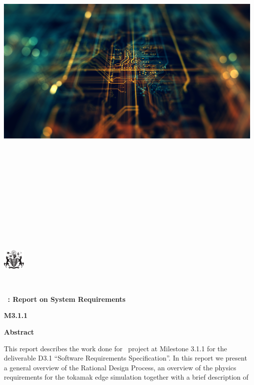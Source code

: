 \documentclass{article}
\begin{document}
\includegraphics[width=952pt, height=520pt, keepaspectratio=true]{../corpics/cctboard.jpg}

\includegraphics[width=31pt, height=29pt, keepaspectratio=true]{../corpics/UKAEA-arms.png}

{\huge{}{ \textbf{\exc \   }}}

{\huge{}{ \textbf{\nep \  : Report on System Requirements}}}

{\huge{}{ \textbf{M3.1.1}}}

\baselineskip=12pt
{ \textbf{Abstract}}

This report describes the work done for \nep \   project at Milestone 3.1.1 for 
the deliverable D3.1 ``Software Requirements Specification''. In this report we 
present a general overview of the Rational Design Process, an overview of the physics 
requirements for the tokamak edge simulation together with a brief description 
of 
\end{document}
